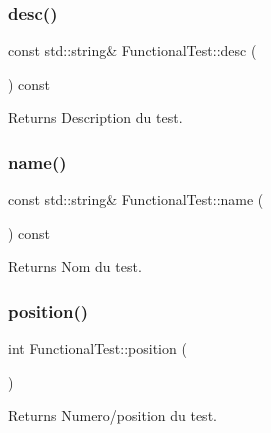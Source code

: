 \subsubsection{\texorpdfstring{desc()}{desc()}}
{\footnotesize\ttfamily const std\+::string\& Functional\+Test\+::desc (\begin{DoxyParamCaption}{ }\end{DoxyParamCaption}) const\hspace{0.3cm}{\ttfamily [inline]}}

\begin{DoxyReturn}{Returns}
Description du test. 
\end{DoxyReturn}
\mbox{\label{classFunctionalTest_ae40fb49a44014898c3b647e96a485922}} 
\subsubsection{\texorpdfstring{name()}{name()}}
{\footnotesize\ttfamily const std\+::string\& Functional\+Test\+::name (\begin{DoxyParamCaption}{ }\end{DoxyParamCaption}) const\hspace{0.3cm}{\ttfamily [inline]}}

\begin{DoxyReturn}{Returns}
Nom du test. 
\end{DoxyReturn}
\mbox{\label{classFunctionalTest_ad12ed2cc723ce1584ff0a5c7dcddcf5e}} 
\subsubsection{\texorpdfstring{position()}{position()}}
{\footnotesize\ttfamily int Functional\+Test\+::position (\begin{DoxyParamCaption}{ }\end{DoxyParamCaption})\hspace{0.3cm}{\ttfamily [inline]}}

\begin{DoxyReturn}{Returns}
Numero/position du test. 
\end{DoxyReturn}
\mbox{\label{classFunctionalTest_a9942d82ed217f8410935d88cd70f64c5}} 
